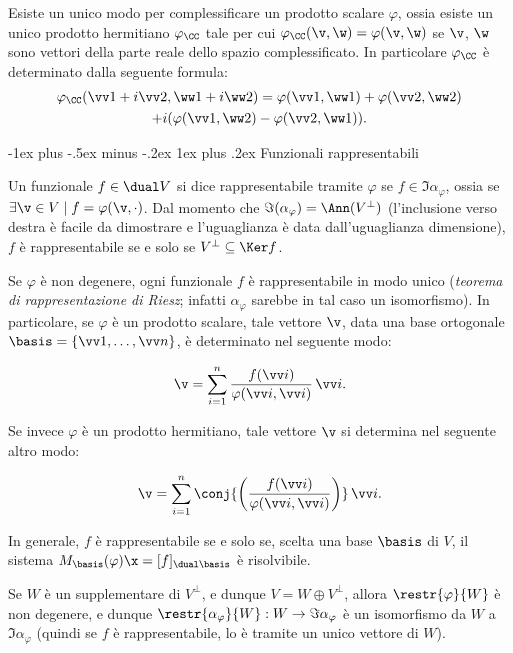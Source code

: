 \documentclass[10pt,landscape]{article}
\makeatletter
\renewcommand{\subsubsection}{\@startsection{subsubsection}{3}{0mm}%
	{-1ex plus -.5ex minus -.2ex}%
	{1ex plus .2ex}%
	{\normalfont\small\bfseries}}
\makeatother
\begin{document}
\begin{multicols}{3}
		Esiste un unico modo per complessificare un prodotto scalare $\varphi$, ossia
		esiste un unico prodotto hermitiano $\varphi_\CC$ tale per cui $\varphi_\CC(\v, \w) = \varphi(\v, \w)$ se $\v$, $\w$ sono vettori della parte reale dello spazio complessificato. In particolare $\varphi_\CC$ è determinato dalla seguente
		formula:
		\begin{multline*}
			\varphi_\CC(\vv 1 + i \vv 2, \ww 1 + i \ww 2) = \varphi(\vv 1, \ww 1) + \varphi(\vv 2, \ww 2) \\ + i (\varphi(\vv 1, \ww 2) - \varphi(\vv 2, \ww 1)).
		\end{multline*}
		
		\subsubsection{Funzionali rappresentabili}
		
		Un funzionale $f \in \dual V$ si dice rappresentabile tramite $\varphi$ se
		$f \in \Im \alpha_\varphi$, ossia se $\exists \v \in V \mid f = \varphi(\v, \cdot)$.
		Dal momento che $\Im(\alpha_\varphi) = \Ann(V^\perp)$ (l'inclusione verso destra è facile da dimostrare e l'uguaglianza è data dall'uguaglianza dimensione), $f$ è rappresentabile
		se e solo se $V^\perp \subseteq \Ker f$.
		
		Se $\varphi$ è non degenere, ogni funzionale $f$ è rappresentabile in modo unico (\textit{teorema
		di rappresentazione di Riesz}; infatti $\alpha_\varphi$ sarebbe in tal caso
		un isomorfismo). In particolare, se $\varphi$ è un prodotto scalare, tale
		vettore $\v$, data una base ortogonale $\basis = \{ \vv 1, \ldots, \vv n\}$, è
		determinato nel seguente modo:
		
		\[ \v = \sum_{i=1}^n \frac{f(\vv i)}{\varphi(\vv i, \vv i)} \, \vv i. \]
		
		Se invece $\varphi$ è un prodotto hermitiano, tale vettore $\v$ si determina
		nel seguente altro modo:
		
		\[ \v = \sum_{i=1}^n \conj{\left(\frac{f(\vv i)}{\varphi(\vv i, \vv i)}\right)} \, \vv i. \]
		
		In generale, $f$ è rappresentabile se e solo se, scelta una base $\basis$ di
		$V$, il sistema $M_\basis(\varphi) \x = [f]_{\dual \basis}$ è risolvibile.
		
		Se $W$ è un supplementare di $V^\perp$, e dunque $V = W \oplus V^\perp$, allora
		$\restr{\varphi}{W}$ è non degenere, e dunque $\restr{\alpha_{\varphi}}{W} : W \to \Im \alpha_\varphi$ è
		un isomorfismo da $W$ a $\Im \alpha_\varphi$ (quindi se $f$ è rappresentabile,
		lo è tramite un unico vettore di $W$).
		

\end{multicols}
\end{document}
